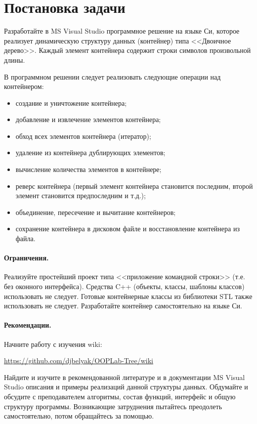 \section{Постановка задачи}

Разработайте в MS Visual Studio программное решение на языке Си, которое реализует динамическую структуру данных (контейнер) типа <<Двоичное дерево>>. 
Каждый элемент контейнера содержит строки символов произвольной длины. 

В программном решении следует реализовать следующие операции над контейнером: 
\begin{itemize}
\item создание и уничтожение контейнера; 
\item  добавление и извлечение элементов контейнера; 
\item  обход всех элементов контейнера (итератор); 
\item удаление из контейнера дублирующих элементов; 
\item  вычисление количества элементов в контейнере; 
\item  реверс контейнера (первый элемент контейнера становится последним, второй элемент становится предпоследним и т.д.); 
\item  объединение, пересечение и вычитание контейнеров; 
\item  сохранение контейнера в дисковом файле и восстановление контейнера из файла. 
\end{itemize}

\paragraph{Ограничения.}

Реализуйте простейший проект типа <<приложение командной строки>> (т.е. без оконного интерфейса). 
Средства C++ (объекты, классы, шаблоны классов) использовать не следует. 
Готовые контейнерные классы из библиотеки STL также использовать не следует. Разработайте контейнер самостоятельно на языке Си. 

\paragraph{Рекомендации.}
 Начните работу с изучения wiki:

 \href{https://github.com/djbelyak/OOPLab-Tree/wiki}{https://github.com/djbelyak/OOPLab-Tree/wiki}

Найдите и изучите в рекомендованной литературе и в документации MS Visual Studio описания и примеры реализаций данной структуры данных. 
Обдумайте и обсудите с преподавателем алгоритмы, состав функций, интерфейс и общую структуру программы. 
Возникающие затруднения пытайтесь преодолеть самостоятельно, потом обращайтесь за помощью. 

